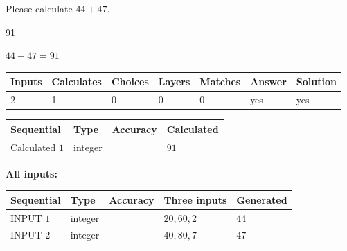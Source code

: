 \documentclass[12pt]{article}
\begin{document}
  
 
Please calculate $ %
44 +  %
47 $.
 
 
 
\noindent{}
 
 

91
 
 
\noindent{}
 
 

 
 
 
\noindent{}
 
 

$ %
44 +  %
47=   %
91$
 
 
\noindent{}
 
 

 
   
   
   
   
\noindent\begin{tabular}{|l|l|l|l|l|l|l|}
 \hline
Inputs & Calculates & Choices & Layers & Matches & Answer & Solution \\ \hline
 2  & 
 1  & 
 0
  & 
 0  & 
 0  & 
  yes & 
  yes 
  \\ \hline
 \end{tabular}
   
   
   
   
\noindent{}
   
   
  
  
\noindent\begin{tabular}{|l|l|l|l|}
\hline
 Sequential & Type & Accuracy & Calculated \\ 
\hline
 
 
  Calculated $  1 $ & integer &  & 
  $ 91 $ 
 \\  \hline  
 \end{tabular}
   
   
   
   
\noindent\vspace{0.1in}\hspace{-0.08in} {\textbf{\Large{All inputs: }}}
   
   
  
  
\noindent\begin{tabular}{|l|l|l|l|l|}
\hline
 Sequential & Type & Accuracy & Three inputs & Generated \\ 
\hline
 
 
  INPUT $  1 $ & integer &  & $
 20
 , 
 60
 , 
 2
 $ & $ 44 $ 
 \\  \hline  
 
 
  INPUT $  2 $ & integer &  & $
 40
 , 
 80
 , 
 7
 $ & $ 47 $ 
 \\  \hline  
 \end{tabular}
   
\end{document}
